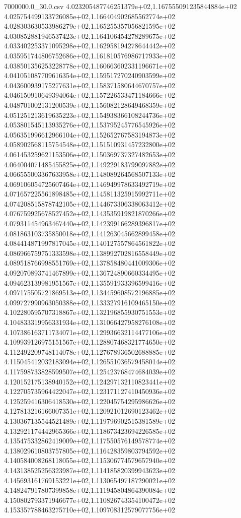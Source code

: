 \begin{filecontents*}{7000000.0_30.0.csv}
4.023205487746251379e+02,1.167555091235844884e+02
4.025754499133726085e+02,1.166404902685562774e+02
4.028303630533986279e+02,1.165255357056821595e+02
4.030852881946537423e+02,1.164106454278289675e+02
4.033402253371095298e+02,1.162958194278644442e+02
4.035951744806752686e+02,1.161810576986717933e+02
4.038501356253228778e+02,1.160663602331196671e+02
4.041051087709616354e+02,1.159517270240903599e+02
4.043600939175277631e+02,1.158371580644670757e+02
4.046150910649394064e+02,1.157226533471184666e+02
4.048701002131200539e+02,1.156082128649468359e+02
4.051251213619635223e+02,1.154938366108244736e+02
4.053801545113935276e+02,1.153795245776545926e+02
4.056351996612966104e+02,1.152652767583194873e+02
4.058902568115754548e+02,1.151510931457232800e+02
4.061453259621153506e+02,1.150369737327482653e+02
4.064004071485455825e+02,1.149229183799097882e+02
4.066555003367633958e+02,1.148089264568507133e+02
4.069106054725607464e+02,1.146949978633492719e+02
4.071657225561898485e+02,1.145811325915992711e+02
4.074208515878742105e+02,1.144673306338063412e+02
4.076759925678527452e+02,1.143535919821870266e+02
4.079311454963467440e+02,1.142399166289396817e+02
4.081863103735850018e+02,1.141263045662899458e+02
4.084414871997817045e+02,1.140127557864561822e+02
4.086966759751333598e+02,1.138992702816558449e+02
4.089518766998551769e+02,1.137858480441009306e+02
4.092070893741467899e+02,1.136724890660334495e+02
4.094623139981951567e+02,1.135591933396599416e+02
4.097175505721869513e+02,1.134459608572196885e+02
4.099727990963050388e+02,1.133327916109465150e+02
4.102280595707318867e+02,1.132196855930751553e+02
4.104833319956331934e+02,1.131066427958276108e+02
4.107386163711734071e+02,1.129936632114477106e+02
4.109939126975151567e+02,1.128807468321774650e+02
4.112492209748114078e+02,1.127678936502688885e+02
4.115045412032183094e+02,1.126551036579458014e+02
4.117598733828599507e+02,1.125423768474684039e+02
4.120152175138940152e+02,1.124297132110823441e+02
4.122705735964422047e+02,1.123171127410450936e+02
4.125259416306418530e+02,1.122045754295986626e+02
4.127813216166007351e+02,1.120921012690123462e+02
4.130367135544521489e+02,1.119796902515381589e+02
4.132921174442965366e+02,1.118673423694226585e+02
4.135475332862419009e+02,1.117550576149578774e+02
4.138029610803757805e+02,1.116428359803794592e+02
4.140584008268118055e+02,1.115306774579657940e+02
4.143138525256323987e+02,1.114185820399943623e+02
4.145693161769153221e+02,1.113065497187290021e+02
4.148247917807399858e+02,1.111945804864390084e+02
4.150802793371946677e+02,1.110826743354100472e+02
4.153357788463275710e+02,1.109708312579077756e+02

\end{filecontents*}
